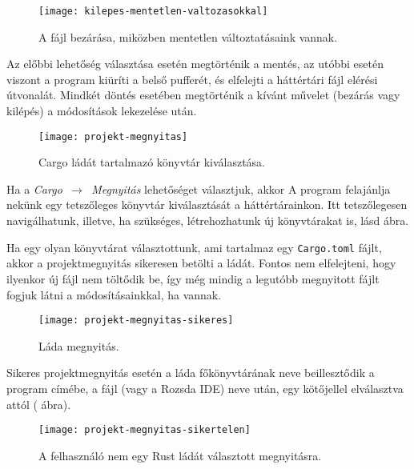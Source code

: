 \begin{figure}[h]
    \centering
    \texttt{[image: kilepes-mentetlen-valtozasokkal]}
    \caption{A fájl bezárása, miközben mentetlen változtatásaink vannak.}
    \label{fig:mentetlen-fajl}
\end{figure}

Az előbbi lehetőség választása esetén megtörténik a mentés,
az utóbbi esetén viszont a program kiüríti a belső pufferét, és elfelejti a háttértári fájl elérési útvonalát.
Mindkét döntés esetében megtörténik a kívánt művelet (bezárás vagy kilépés) a módosítások lekezelése után.


\begin{figure}[h]
    \centering
    \texttt{[image: projekt-megnyitas]}
    \caption{Cargo ládát tartalmazó könyvtár kiválasztása.}
    \label{fig:projekt-megnyitas}
\end{figure}

Ha a \textit{Cargo $\,\to\,$ Megnyitás} lehetőséget választjuk, akkor A program felajánlja
nekünk egy tetszőleges könyvtár kiválasztását a háttértárainkon.
Itt tetszőlegesen navigálhatunk, illetve, ha szükséges, létrehozhatunk új könyvtárakat is, lásd  ábra.

Ha egy olyan könyvtárat választottunk, ami tartalmaz egy \texttt{Cargo.toml} fájlt,
akkor a projektmegnyitás sikeresen betölti a ládát.
Fontos nem elfelejteni, hogy ilyenkor új fájl nem töltődik be,
így még mindig a legutóbb megnyitott fájlt fogjuk látni a módosításainkkal, ha vannak.

\begin{figure}[h]
    \centering
    \texttt{[image: projekt-megnyitas-sikeres]}
    \caption{Láda megnyitás.}
    \label{fig:projekt-megnyitas-sikeres}
\end{figure}

Sikeres projektmegnyitás esetén a láda főkönyvtárának neve beillesztődik a program címébe,
a fájl (vagy a Rozsda IDE) neve után, egy kötőjellel elválasztva attól ( ábra).

\begin{figure}[h]
    \centering
    \texttt{[image: projekt-megnyitas-sikertelen]}
    \caption{A felhasználó nem egy Rust ládát választott megnyitásra.}
    \label{fig:projekt-megnyitas-sikertelen}
\end{figure}

